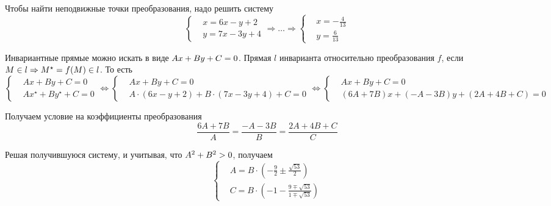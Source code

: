\documentclass[a4paper,12pt]{article}
\begin{document}
\begin{solution}
    Чтобы найти неподвижные точки преобразования, надо решить систему
    \[
      \left\{
        \begin{aligned}
          &x = 6x - y + 2\\
          &y = 7x - 3y + 4
        \end{aligned}
      \right.
      \Rightarrow \ldots
      \Rightarrow \left\{
        \begin{aligned}
          &x = -\frac{4}{13}\\
          &y = \frac{6}{13}
        \end{aligned}
      \right.
    \]
    
    Инвариантные прямые можно искать в виде $Ax + By + C \hm= 0$.
    Прямая $l$ инварианта относительно преобразования $f$, если $M \hm\in l \hm\Rightarrow M^\star \hm= f(M) \hm\in l$.
    То есть
    \[
      \left\{
        \begin{aligned}
          &Ax + By + C = 0\\
          &Ax^\star + By^\star + C = 0
        \end{aligned}
      \right.
      \Leftrightarrow \left\{
        \begin{aligned}
          &Ax + By + C = 0\\
          &A \cdot (6x - y + 2) + B \cdot (7x - 3y + 4) + C = 0
        \end{aligned}
      \right.
      \Leftrightarrow \left\{
        \begin{aligned}
          &Ax + By + C = 0\\
          &(6A + 7B) x + (-A - 3B) y + (2A + 4B + C) = 0
        \end{aligned}
      \right.
    \]
    
    Получаем условие на коэффициенты преобразования
    \[
      \frac{6A + 7B}{A} = \frac{-A - 3B}{B} = \frac{2A + 4B + C}{C}
    \]
    
    Решая получившуюся систему, и учитывая, что $A^2 \hm+ B^2 \hm> 0$, получаем
    \[
      \left\{
        \begin{aligned}
          &A = B \cdot \left(-\frac{9}{2} \pm \frac{\sqrt{53}}{2}\right)\\
          &C = B \cdot \left(-1 - \frac{9 \mp \sqrt{53}}{1 \mp \sqrt{53}}\right)
        \end{aligned}
      \right.
    \]
  \end{solution}
\end{document}
